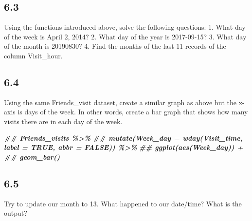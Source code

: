 \documentclass[
]{book}
\newenvironment{Shaded}{\begin{snugshade}}{\end{snugshade}}
\newcommand{\CommentTok}[1]{\textcolor[rgb]{0.56,0.35,0.01}{\textit{#1}}}
\newcommand{\DocumentationTok}[1]{\textcolor[rgb]{0.56,0.35,0.01}{\textbf{\textit{#1}}}}
\begin{document}
\hypertarget{section-34}{%
\subsection{6.3}\label{section-34}}

Using the functions introduced above, solve the following questions:
1. What day of the week is April 2, 2014?
2. What day of the year is 2017-09-15?
3. What day of the month is 20190830?
4. Find the months of the last 11 records of the column Visit\_hour.

\begin{Shaded}
\end{Shaded}

\hypertarget{section-35}{%
\subsection{6.4}\label{section-35}}

Using the same Friends\_visit dataset, create a similar graph as above but the x-axis is days of the week. In other words, create a bar graph that shows how many visits there are in each day of the week.

\begin{Shaded}
\begin{Highlighting}[]
\DocumentationTok{\#\# Friends\_visits \%\textgreater{}\%}
\DocumentationTok{\#\#  mutate(Week\_day = wday(Visit\_time, label = TRUE, abbr = FALSE)) \%\textgreater{}\%}
\DocumentationTok{\#\#  ggplot(aes(Week\_day)) +}
\DocumentationTok{\#\#  geom\_bar()}
\end{Highlighting}
\end{Shaded}

\hypertarget{section-36}{%
\subsection{6.5}\label{section-36}}

Try to update our month to 13. What happened to our date/time? What is the output?
\end{document}
